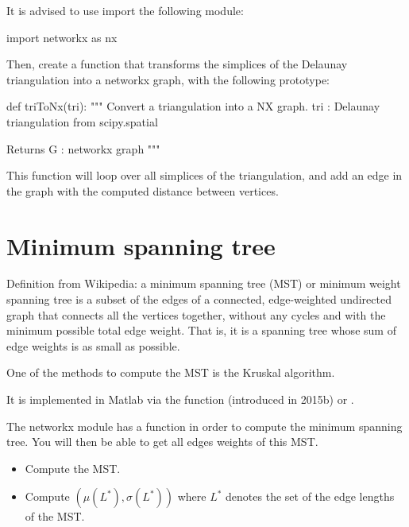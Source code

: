 \begin{pcomment}
It is advised to use import the following module:
\begin{python}
import networkx as nx
\end{python}

Then, create a function that transforms the simplices of the Delaunay triangulation into a networkx graph, with the following prototype:

\begin{python}
def triToNx(tri): 
"""
    Convert a triangulation into a NX graph.
    tri : Delaunay triangulation from scipy.spatial

    Returns
    G : networkx graph
    """
\end{python}
This function will loop over all simplices of the triangulation, and add an edge in the graph with the computed distance between vertices. 

\end{pcomment}


\section{Minimum spanning tree}
Definition from Wikipedia: a minimum spanning tree (MST) or minimum weight spanning tree is a subset of the edges of a connected, edge-weighted undirected graph that connects all the vertices together, without any cycles and with the minimum possible total edge weight. 
That is, it is a spanning tree whose sum of edge weights is as small as possible.

One of the methods to compute the MST is the Kruskal algorithm. 

\begin{mcomment}
\begin{mremark}
It is implemented in Matlab via the function 
 (introduced in \matlabregistered{} 2015b) or .
\end{mremark}
\end{mcomment}

\begin{pcomment}
 \begin{premark}
 The networkx module has a function in order to compute the minimum spanning tree. You will then be able to get all edges weights of this MST.
 \end{premark}

\end{pcomment}


\begin{qbox}
 \begin{itemize}
 \item Compute the MST.
  \item  Compute $(\mu(L^*),\sigma(L^*))$ where $L^*$ denotes the set of the edge lengths of the 
MST.
 \end{itemize}
\end{qbox}



